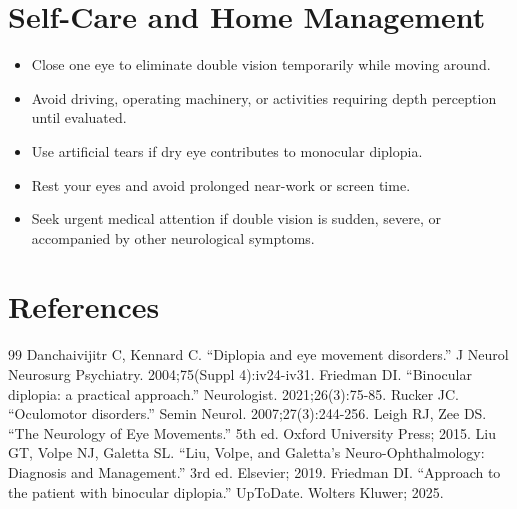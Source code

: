 \section*{Self-Care and Home Management}
\begin{itemize}
  \item Close one eye to eliminate double vision temporarily while moving around.
  \item Avoid driving, operating machinery, or activities requiring depth perception until evaluated.
  \item Use artificial tears if dry eye contributes to monocular diplopia.
  \item Rest your eyes and avoid prolonged near-work or screen time.
  \item Seek urgent medical attention if double vision is sudden, severe, or accompanied by other neurological symptoms.
\end{itemize}

\section*{References}
\begin{thebibliography}{99}
 Danchaivijitr C, Kennard C. ``Diplopia and eye movement disorders.'' J Neurol Neurosurg Psychiatry. 2004;75(Suppl 4):iv24-iv31.
 Friedman DI. ``Binocular diplopia: a practical approach.'' Neurologist. 2021;26(3):75-85.
 Rucker JC. ``Oculomotor disorders.'' Semin Neurol. 2007;27(3):244-256.
 Leigh RJ, Zee DS. ``The Neurology of Eye Movements.'' 5th ed. Oxford University Press; 2015.
 Liu GT, Volpe NJ, Galetta SL. ``Liu, Volpe, and Galetta's Neuro-Ophthalmology: Diagnosis and Management.'' 3rd ed. Elsevier; 2019.
 Friedman DI. ``Approach to the patient with binocular diplopia.'' UpToDate. Wolters Kluwer; 2025.
\end{thebibliography}
